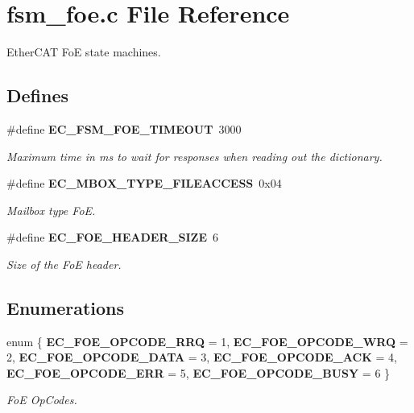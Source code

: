 \section{fsm\-\_\-foe.\-c \-File \-Reference}
\label{fsm__foe_8c}


\-Ether\-C\-A\-T \-Fo\-E state machines.  


\subsection*{\-Defines}
\begin{DoxyCompactItemize}
\item 
\#define {\bf \-E\-C\-\_\-\-F\-S\-M\-\_\-\-F\-O\-E\-\_\-\-T\-I\-M\-E\-O\-U\-T}~3000\label{fsm__foe_8c_a4246c4ce35bd79643952b5a0063a9bc3}

\begin{DoxyCompactList}\small\item\em \-Maximum time in ms to wait for responses when reading out the dictionary. \end{DoxyCompactList}\item 
\#define {\bf \-E\-C\-\_\-\-M\-B\-O\-X\-\_\-\-T\-Y\-P\-E\-\_\-\-F\-I\-L\-E\-A\-C\-C\-E\-S\-S}~0x04\label{fsm__foe_8c_a490c6164b77b35a76c142d7ae688ee46}

\begin{DoxyCompactList}\small\item\em \-Mailbox type \-Fo\-E. \end{DoxyCompactList}\item 
\#define {\bf \-E\-C\-\_\-\-F\-O\-E\-\_\-\-H\-E\-A\-D\-E\-R\-\_\-\-S\-I\-Z\-E}~6\label{fsm__foe_8c_a0a2af366a118692e3d53d956a80f9fc3}

\begin{DoxyCompactList}\small\item\em \-Size of the \-Fo\-E header. \end{DoxyCompactList}\end{DoxyCompactItemize}
\subsection*{\-Enumerations}
\begin{DoxyCompactItemize}
\item 
enum \{ \*
{\bf \-E\-C\-\_\-\-F\-O\-E\-\_\-\-O\-P\-C\-O\-D\-E\-\_\-\-R\-R\-Q} =  1, 
{\bf \-E\-C\-\_\-\-F\-O\-E\-\_\-\-O\-P\-C\-O\-D\-E\-\_\-\-W\-R\-Q} =  2, 
{\bf \-E\-C\-\_\-\-F\-O\-E\-\_\-\-O\-P\-C\-O\-D\-E\-\_\-\-D\-A\-T\-A} =  3, 
{\bf \-E\-C\-\_\-\-F\-O\-E\-\_\-\-O\-P\-C\-O\-D\-E\-\_\-\-A\-C\-K} =  4, 
\*
{\bf \-E\-C\-\_\-\-F\-O\-E\-\_\-\-O\-P\-C\-O\-D\-E\-\_\-\-E\-R\-R} =  5, 
{\bf \-E\-C\-\_\-\-F\-O\-E\-\_\-\-O\-P\-C\-O\-D\-E\-\_\-\-B\-U\-S\-Y} =  6
 \}
\begin{DoxyCompactList}\small\item\em \-Fo\-E \-Op\-Codes. \end{DoxyCompactList}\end{DoxyCompactItemize}
